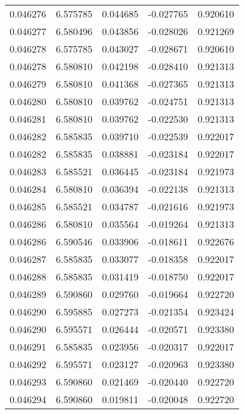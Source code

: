\begin{tabular}{lrrrr}
0.046276    &  6.575785 &  0.044685 & -0.027765 &             0.920610 \\
0.046277    &  6.580496 &  0.043856 & -0.028026 &             0.921269 \\
0.046278    &  6.575785 &  0.043027 & -0.028671 &             0.920610 \\
0.046278    &  6.580810 &  0.042198 & -0.028410 &             0.921313 \\
0.046279    &  6.580810 &  0.041368 & -0.027365 &             0.921313 \\
0.046280    &  6.580810 &  0.039762 & -0.024751 &             0.921313 \\
0.046281    &  6.580810 &  0.039762 & -0.022530 &             0.921313 \\
0.046282    &  6.585835 &  0.039710 & -0.022539 &             0.922017 \\
0.046282    &  6.585835 &  0.038881 & -0.023184 &             0.922017 \\
0.046283    &  6.585521 &  0.036445 & -0.023184 &             0.921973 \\
0.046284    &  6.580810 &  0.036394 & -0.022138 &             0.921313 \\
0.046285    &  6.585521 &  0.034787 & -0.021616 &             0.921973 \\
0.046286    &  6.580810 &  0.035564 & -0.019264 &             0.921313 \\
0.046286    &  6.590546 &  0.033906 & -0.018611 &             0.922676 \\
0.046287    &  6.585835 &  0.033077 & -0.018358 &             0.922017 \\
0.046288    &  6.585835 &  0.031419 & -0.018750 &             0.922017 \\
0.046289    &  6.590860 &  0.029760 & -0.019664 &             0.922720 \\
0.046290    &  6.595885 &  0.027273 & -0.021354 &             0.923424 \\
0.046290    &  6.595571 &  0.026444 & -0.020571 &             0.923380 \\
0.046291    &  6.585835 &  0.023956 & -0.020317 &             0.922017 \\
0.046292    &  6.595571 &  0.023127 & -0.020963 &             0.923380 \\
0.046293    &  6.590860 &  0.021469 & -0.020440 &             0.922720 \\
0.046294    &  6.590860 &  0.019811 & -0.020048 &             0.922720 \\

\end{tabular}
